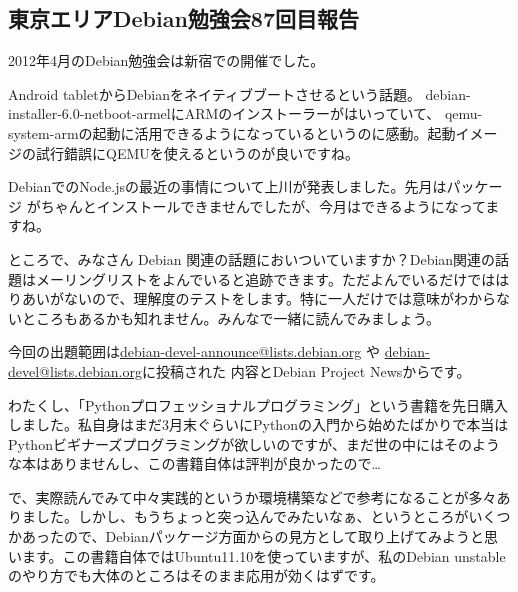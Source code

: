 \documentclass[mingoth,a4paper]{jsarticle}
\begin{document}
\subsection{東京エリアDebian勉強会87回目報告}

2012年4月のDebian勉強会は新宿での開催でした。

Android tabletからDebianをネイティブブートさせるという話題。
debian-installer-6.0-netboot-armelにARMのインストーラーがはいっていて、
qemu-system-armの起動に活用できるようになっているというのに感動。起動イメー
ジの試行錯誤にQEMUを使えるというのが良いですね。

DebianでのNode.jsの最近の事情について上川が発表しました。先月はパッケージ
がちゃんとインストールできませんでしたが、今月はできるようになってますね。


ところで、みなさん Debian 関連の話題においついていますか？Debian関連の話
題はメーリングリストをよんでいると追跡できます。ただよんでいるだけではは
りあいがないので、理解度のテストをします。特に一人だけでは意味がわからな
いところもあるかも知れません。みんなで一緒に読んでみましょう。

今回の出題範囲は\url{debian-devel-announce@lists.debian.org} や \url{debian-devel@lists.debian.org}に投稿された
内容とDebian Project Newsからです。

\begin{multicols}{2}
 
\end{multicols}

\label{sec:python-professional-programing}

わたくし、「Pythonプロフェッショナルプログラミング」という書籍を先日購入しました。私自身はまだ3月末ぐらいにPythonの入門から始めたばかりで本当はPythonビギナーズプログラミングが欲しいのですが、まだ世の中にはそのような本はありませんし、この書籍自体は評判が良かったので…

で、実際読んでみて中々実践的というか環境構築などで参考になることが多々ありました。しかし、もうちょっと突っ込んでみたいなぁ、というところがいくつかあったので、Debianパッケージ方面からの見方として取り上げてみようと思います。この書籍自体ではUbuntu11.10を使っていますが、私のDebian unstableのやり方でも大体のところはそのまま応用が効くはずです。
\end{document}
